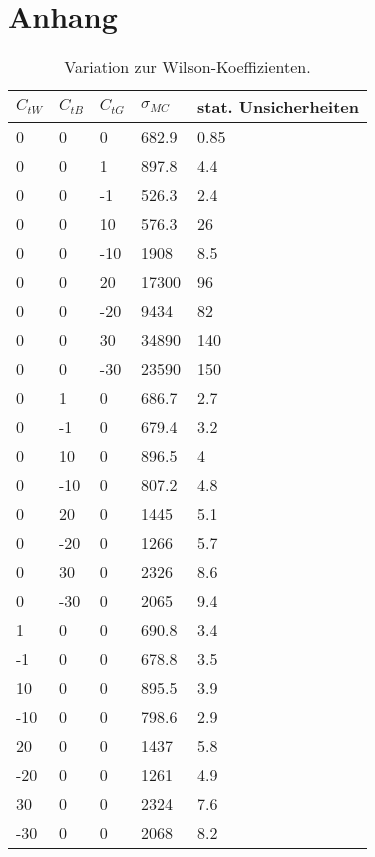 \chapter{Anhang}
\begin{table}
  \centering
  \caption{Variation zur Wilson-Koeffizienten.}
  \begin{tabular}{lllll}
    \toprule
    $C_{tW}$ & $C_{tB}$ & $C_{tG}$ & $\sigma_{MC}$ & stat. Unsicherheiten\\
		\midrule
  0    &     0      &     0      &      682.9   &    0.85\\
  0    &     0      &     1      &      897.8   &    4.4\\
  0    &     0      &     -1     &      526.3   &    2.4\\
  0    &     0      &     10     &      576.3   &    26\\
  0    &     0      &     -10    &      1908    &    8.5\\
  0    &     0      &     20     &      17300   &    96\\
  0    &     0      &     -20    &      9434    &    82\\
  0    &     0      &     30     &      34890   &    140\\
  0    &     0      &     -30    &      23590   &    150\\
  0    &     1      &     0      &      686.7   &    2.7\\
  0    &     -1     &     0      &      679.4   &    3.2\\
  0    &     10     &     0      &      896.5   &    4\\
  0    &     -10    &     0      &      807.2   &    4.8\\
  0    &     20     &     0      &      1445    &    5.1\\
  0    &     -20    &     0      &      1266    &    5.7\\
  0    &     30     &     0      &      2326    &    8.6\\
  0    &     -30    &     0      &      2065    &    9.4\\
  1    &     0      &     0      &      690.8   &    3.4\\
  -1   &     0      &     0      &      678.8   &    3.5\\
  10   &     0      &     0      &      895.5   &    3.9\\
  -10  &     0      &     0      &      798.6   &    2.9\\
  20   &     0      &     0      &      1437    &    5.8\\
  -20  &     0      &     0      &      1261    &    4.9\\
  30   &     0      &     0      &      2324    &    7.6\\
  -30   &    0      &     0      &      2068   &     8.2\\
  \bottomrule
\end{tabular}
\label{tab:lit}
\end{table}
